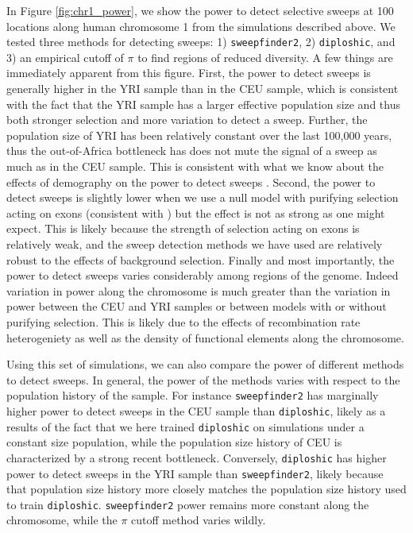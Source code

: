 \documentclass[hidelinks]{article}
\newcommand{\sweepfinder}{\texttt{sweepfinder2}\xspace}
\newcommand{\diploshic}{\texttt{diploshic}\xspace}
\begin{document}
    In Figure \ref{fig:chr1_power}, we show the power to detect selective sweeps at 100 locations along human chromosome 1 from
    the simulations described above. We tested three methods for detecting sweeps: 1) \sweepfinder \citep{degiorgio2016sweepfinder2},
    2) \diploshic \citep{kern2018diplos}, and 3) an empirical cutoff of $\pi$ to find regions of reduced diversity.
    A few things are immediately apparent from this figure. First, the power to detect sweeps is generally higher in the YRI sample
    than in the CEU sample, which is consistent with the fact that the YRI sample has a larger effective population size and thus both stronger selection and
    more variation to detect a sweep. Further, the population size of YRI has been relatively constant over the last 100,000 years,
    thus the out-of-Africa bottleneck has does not mute the signal of a sweep as much as in the CEU sample. This is consistent with
    what we know about the effects of demography on the power to detect sweeps \citep[e.g.,][]{simonsen1995properties}.
    Second, the power to detect sweeps is slightly lower when we use a null model with purifying selection acting on exons (consistent with \cite{schrider2020background}) but the effect is not
    as strong as one might expect. This is likely because the strength of selection acting on exons is relatively weak, and the
    sweep detection methods we have used are relatively robust to the effects of background selection. 
    Finally and most importantly, the power to detect sweeps varies considerably among regions of the genome. 
    Indeed variation in power along the chromosome is much greater than the variation in power between the CEU and YRI samples or between
    models with or without purifying selection. This is likely due to the effects of recombination rate heterogeniety as well
    as the density of functional elements along the chromosome.

    Using this set of simulations, we can also compare the power of different methods to detect sweeps.
    In general, the power of the methods varies with respect to the population history of the sample.
    For instance \sweepfinder has marginally higher power to detect sweeps in the CEU sample than \diploshic,
    likely as a results of the fact that we here trained \diploshic on simulations under a constant size population,
    while the population size history of CEU is characterized by a strong recent bottleneck.
    Conversely, \diploshic has higher power to detect sweeps in the YRI sample than \sweepfinder,
    likely because that population size history more closely matches the population size history used to train \diploshic.
    \sweepfinder power remains more constant along the chromosome, while the $\pi$ cutoff method varies wildly. 
\end{document}
